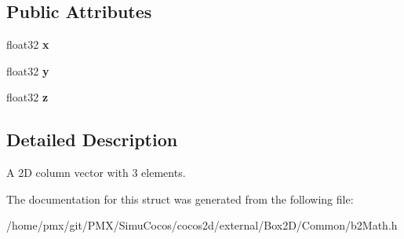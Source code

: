 \subsection*{Public Attributes}
\begin{DoxyCompactItemize}
\item 
\mbox{\label{structb2Vec3_aedc5e37849caa413a8e767fc47741db2}} 
float32 {\bfseries x}
\item 
\mbox{\label{structb2Vec3_af5a7e99d13d02ff9abb323838d44d3b1}} 
float32 {\bfseries y}
\item 
\mbox{\label{structb2Vec3_a7cb88968ff10fa500df0b10f5c425536}} 
float32 {\bfseries z}
\end{DoxyCompactItemize}


\subsection{Detailed Description}
A 2D column vector with 3 elements. 

The documentation for this struct was generated from the following file\+:\begin{DoxyCompactItemize}
\item 
/home/pmx/git/\+P\+M\+X/\+Simu\+Cocos/cocos2d/external/\+Box2\+D/\+Common/b2\+Math.\+h\end{DoxyCompactItemize}
